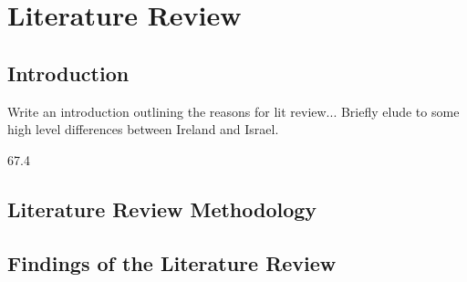 \chapter{Literature Review}

\section{Introduction}

Write an introduction outlining the reasons for lit review... Briefly elude to some high level differences between Ireland and Israel.

67.4%

\section{Literature Review Methodology}





\section{Findings of the Literature Review}
